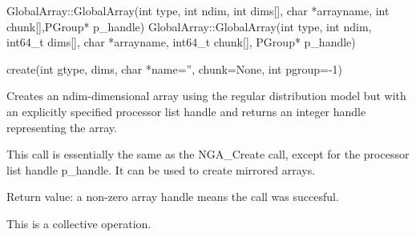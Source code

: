 \documentclass[12pt]{article}
\begin{document}
\begin{cxxapi}
\begin{cxxcode}
GlobalArray::GlobalArray(int type, int ndim, int dims[], char *arrayname,
                         int chunk[],PGroup* p_handle)
GlobalArray::GlobalArray(int type, int ndim, int64_t dims[], char *arrayname,
                         int64_t chunk[], PGroup* p_handle)
\end{cxxcode}
\begin{funcargs}
\end{funcargs}
\end{cxxapi}

\begin{pyapi}
\begin{pycode}
create(int gtype, dims, char *name='', chunk=None, int pgroup=-1)
\end{pycode}
\begin{funcargs}
\end{funcargs}
\end{pyapi}

\dcoll

\begin{desc}

Creates an ndim-dimensional array using the regular distribution model but with
an explicitly specified processor list handle and returns an integer handle
representing the array.

This call is essentially the same as the NGA_Create call, except for the
processor list handle p_handle. It can be used to create mirrored arrays.

Return value: a non-zero array handle means the call was succesful.

This is a collective operation.

\end{desc}

\end{document}
